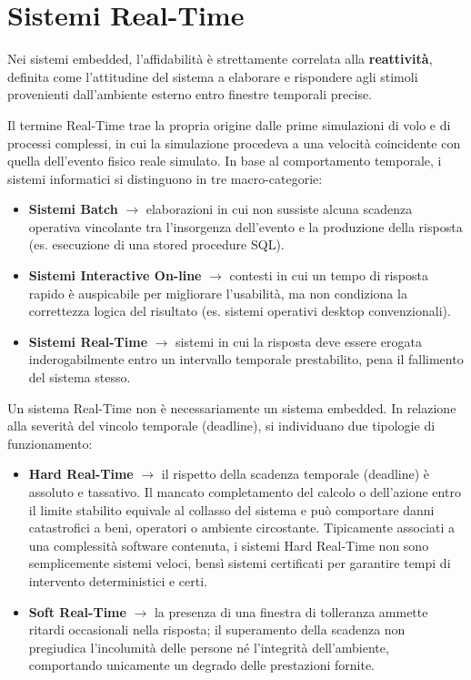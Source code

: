 \section{Sistemi Real-Time}
Nei sistemi embedded, l'affidabilità è strettamente correlata alla \textbf{reattività}, definita come l'attitudine del sistema a elaborare e rispondere agli stimoli provenienti dall'ambiente esterno entro finestre temporali precise.

Il termine Real-Time trae la propria origine dalle prime simulazioni di volo e di processi complessi, in cui la simulazione procedeva a una velocità coincidente con quella dell'evento fisico reale simulato. In base al comportamento temporale, i sistemi informatici si distinguono in tre macro-categorie:
\begin{itemize}
    \item \textbf{Sistemi Batch} $\rightarrow$ elaborazioni in cui non sussiste alcuna scadenza operativa vincolante tra l'insorgenza dell'evento e la produzione della risposta (es. esecuzione di una stored procedure SQL).
    \item \textbf{Sistemi Interactive On-line} $\rightarrow$ contesti in cui un tempo di risposta rapido è auspicabile per migliorare l'usabilità, ma non condiziona la correttezza logica del risultato (es. sistemi operativi desktop convenzionali).
    \item \textbf{Sistemi Real-Time} $\rightarrow$ sistemi in cui la risposta deve essere erogata inderogabilmente entro un intervallo temporale prestabilito, pena il fallimento del sistema stesso.
\end{itemize}

Un sistema Real-Time non è necessariamente un sistema embedded. In relazione alla severità del vincolo temporale (deadline), si individuano due tipologie di funzionamento:
\begin{itemize}
    \item \textbf{Hard Real-Time} $\rightarrow$ il rispetto della scadenza temporale (deadline) è assoluto e tassativo. Il mancato completamento del calcolo o dell'azione entro il limite stabilito equivale al collasso del sistema e può comportare danni catastrofici a beni, operatori o ambiente circostante. Tipicamente associati a una complessità software contenuta, i sistemi Hard Real-Time non sono semplicemente sistemi veloci, bensì sistemi certificati per garantire tempi di intervento deterministici e certi.
    \item \textbf{Soft Real-Time} $\rightarrow$ la presenza di una finestra di tolleranza ammette ritardi occasionali nella risposta; il superamento della scadenza non pregiudica l'incolumità delle persone né l'integrità dell'ambiente, comportando unicamente un degrado delle prestazioni fornite.
\end{itemize}

